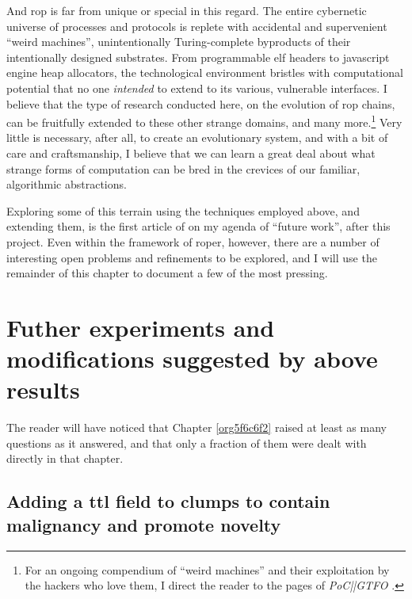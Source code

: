 \documentclass[12pt,glossary]{dalthesis}
\begin{document}
And \gls{rop} is far from unique or special in this regard. The entire cybernetic
universe of processes and protocols is replete with accidental and supervenient
``weird machines'', unintentionally Turing-complete byproducts of their intentionally
designed substrates. From programmable \gls{elf} headers to javascript engine heap
allocators, the technological environment bristles with computational potential
that no one \emph{intended} to extend to its various, vulnerable interfaces. I believe
that the type of research conducted here, on the evolution of \gls{rop} chains, can
be fruitfully extended to these other strange domains, and many more.\footnote{For an ongoing compendium of ``weird machines'' and their exploitation by the
  hackers who love them, I direct the reader to the pages of \emph{PoC||GTFO}
  \cite{pocorgtfo}.} Very little
is necessary, after all, to create an evolutionary system, and with a bit of care
and craftsmanship, I believe that we can learn a great deal about what strange
forms of computation can be bred in the crevices of our familiar, algorithmic
abstractions. 

Exploring some of this terrain using the techniques employed above, and
extending them, is the first article of on my agenda of ``future work'',
after this project. Even within the framework of \gls{roper}, however, there
are a number of interesting open problems and refinements to be explored,
and I will use the remainder of this chapter to document a few of the most
pressing.


\section{Futher experiments and modifications suggested by above results}
\label{sec:orge1f9b8d}

The reader will have noticed that Chapter \ref{org5f6c6f2} raised at least
as many questions as it answered, and that only a fraction of them were dealt
with directly in that chapter. 

\subsection{Adding a \gls{ttl} field to clumps to contain malignancy and promote novelty}
\label{sec:org66116c1}
\end{document}
